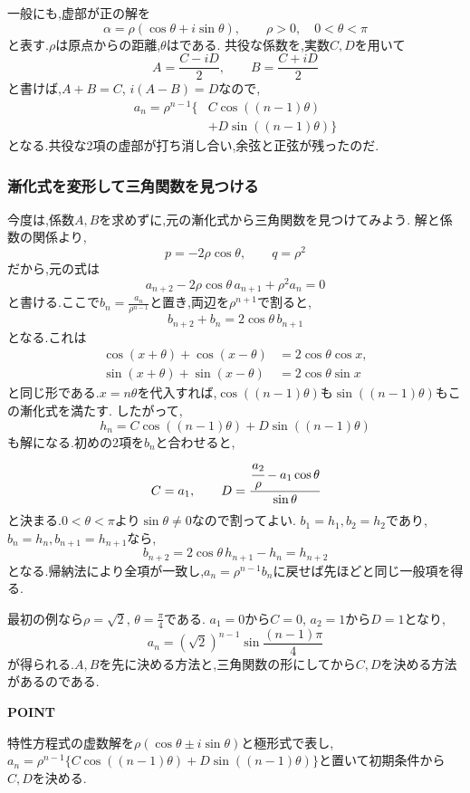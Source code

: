 一般にも,虚部が正の解を
\[
  \alpha=\rho(\cos\theta+i\sin\theta),
  \qquad \rho>0,\quad 0<\theta<\pi
\]
と表す.$\rho$は原点からの距離,$\theta$はである.
共役な係数を,実数$C,D$を用いて
\[
  A=\frac{C-iD}{2},\qquad B=\frac{C+iD}{2}
\]
と書けば,$A+B=C$, $i(A-B)=D$なので,
\[
  \begin{aligned}
    a_n=\rho^{n-1}\{&C\cos((n-1)\theta)\\
      &+D\sin((n-1)\theta)\}
  \end{aligned}
\]
となる.共役な2項の虚部が打ち消し合い,余弦と正弦が残ったのだ.
\BookFigComplexRoots

\subsubsection{漸化式を変形して三角関数を見つける}\label{解釈：漸化式を変形して三角関数を見つける}
今度は,係数$A,B$を求めずに,元の漸化式から三角関数を見つけてみよう.
解と係数の関係より,
\[
  p=-2\rho\cos\theta,\qquad q=\rho^2
\]
だから,元の式は
\[
  a_{n+2}-2\rho\cos\theta\,a_{n+1}+\rho^2a_n=0
\]
と書ける.ここで$b_n=\frac{a_n}{\rho^{n-1}}$と置き,両辺を$\rho^{n+1}$で割ると,
\[
  b_{n+2}+b_n=2\cos\theta\,b_{n+1}
\]
となる.これは
\[
  \begin{aligned}
    \cos(x+\theta)+\cos(x-\theta)&=2\cos\theta\cos x,\\
    \sin(x+\theta)+\sin(x-\theta)&=2\cos\theta\sin x
  \end{aligned}
\]
と同じ形である.$x=n\theta$を代入すれば,$\cos((n-1)\theta)$も$\sin((n-1)\theta)$もこの漸化式を満たす.
したがって,
\[
  h_n=C\cos((n-1)\theta)+D\sin((n-1)\theta)
\]
も解になる.初めの2項を$b_n$と合わせると,
\[
  C=a_1,\qquad
  D=\cfrac{\cfrac{a_2}{\rho}-a_1\cos\theta}{\sin\theta}
\]
と決まる.$0<\theta<\pi$より$\sin\theta\ne0$なので割ってよい.
$b_1=h_1,b_2=h_2$であり,$b_n=h_n,b_{n+1}=h_{n+1}$なら,
\[
  b_{n+2}=2\cos\theta\,h_{n+1}-h_n=h_{n+2}
\]
となる.帰納法により全項が一致し,$a_n=\rho^{n-1}b_n$に戻せば先ほどと同じ一般項を得る.

最初の例なら$\rho=\sqrt2$, $\theta=\frac{\pi}{4}$である.
$a_1=0$から$C=0$, $a_2=1$から$D=1$となり,
\[
  a_n=(\sqrt2)^{n-1}\sin\frac{(n-1)\pi}{4}
\]
が得られる.$A,B$を先に決める方法と,三角関数の形にしてから$C,D$を決める方法があるのである.

\begin{bookpoint}
  \textbf{POINT}\par
  特性方程式の虚数解を$\rho(\cos\theta\pm i\sin\theta)$と極形式で表し,
  $a_n=\rho^{n-1}\{C\cos((n-1)\theta)+D\sin((n-1)\theta)\}$と置いて初期条件から$C,D$を決める.
\end{bookpoint}

